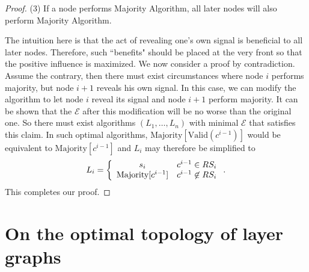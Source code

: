 \documentclass[a4paper,UKenglish]{lipics}
\theoremstyle{definition}
\begin{document}
\begin{proof}
(3) If a node performs Majority Algorithm, all later nodes will also perform Majority Algorithm.
 
The intuition here is that the act of revealing one's own signal is beneficial to all later nodes. 
Therefore, such ``benefits" should be placed at the very front so that the positive influence is maximized.
We now consider a proof by contradiction. 
Assume the contrary, then there must exist circumstances where node $i$ performs majority, but node $i + 1$ reveals his own signal. 
In this case, we can modify the algorithm to let node $i$ reveal its signal and node $i+1$ perform majority. 
It can be shown that the $\mathcal{E}$ after this modification will be no worse than the original one. 
So there must exist algorithms $(L_1, \dots, L_n)$ with minimal $\mathcal{E}$ that satisfies this claim.
In such optimal algorithms, $\text{Majority}[\text{Valid}(c^{i-1})]$ would be equivalent to $\text{Majority}[c^{i-1}]$
	and $L_i$ may therefore be simplified to
\begin{equation*}
L_i 
= \left\{ 
	\begin{array}{c l}
		s_i & c^{i-1} \in RS_i \\
 		\text{Majority}[c^{i-1}] & c^{i-1} \not\in RS_i
 	\end{array}
	\right..
\end{equation*}
This completes our proof.
\end{proof}











\section{On the optimal topology of layer graphs}
\end{document}
